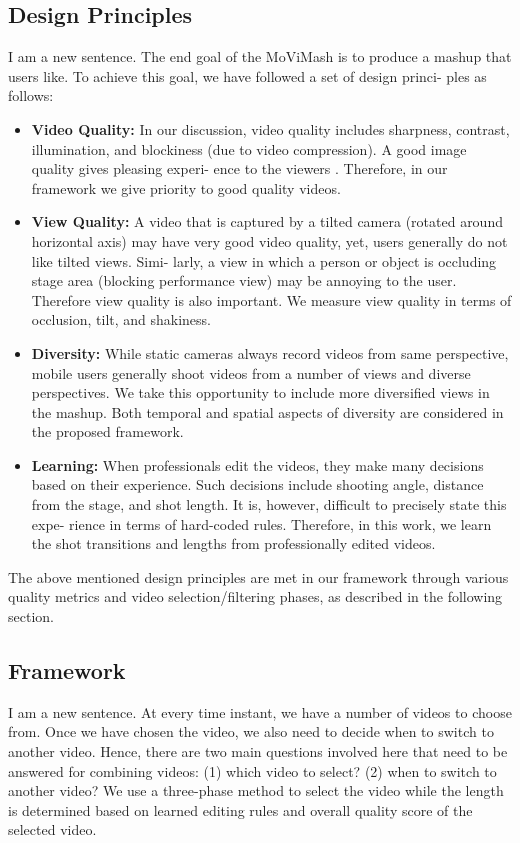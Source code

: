 \documentclass{sig-alternate}
\begin{document}
\subsection{Design Principles}
I am a new sentence.
The end goal of the MoViMash is to produce a mashup that users
like. To achieve this goal, we have followed a set of design princi-
ples as follows:
\begin{itemize}
\item \textbf{Video Quality:} In our discussion, video quality includes
sharpness, contrast, illumination, and blockiness (due to video
compression). A good image quality gives pleasing experi-
ence to the viewers \cite{salas:ten}. Therefore, in our framework we
give priority to good quality videos.
\item \textbf{View Quality:} A video that is captured by a tilted camera
(rotated around horizontal axis) may have very good video
quality, yet, users generally do not like tilted views. Simi-
larly, a view in which a person or object is occluding stage
area (blocking performance view) may be annoying to the
user. Therefore view quality is also important. We measure
view quality in terms of occlusion, tilt, and shakiness.
\item \textbf{Diversity:} While static cameras always record videos from
same perspective, mobile users generally shoot videos from
a number of views and diverse perspectives. We take this
opportunity to include more diversified views in the mashup.
Both temporal and spatial aspects of diversity are considered
in the proposed framework.
\item \textbf{Learning:} When professionals edit the videos, they make
many decisions based on their experience. Such decisions
include shooting angle, distance from the stage, and shot
length. It is, however, difficult to precisely state this expe-
rience in terms of hard-coded rules. Therefore, in this work,
we learn the shot transitions and lengths from professionally
edited videos.
\end{itemize}

The above mentioned design principles are met in our framework
through various quality metrics and video selection/filtering phases,
as described in the following section.

\subsection{Framework}
I am a new sentence.
At every time instant, we have a number of videos to choose
from. Once we have chosen the video, we also need to decide when
to switch to another video. Hence, there are two main questions
involved here that need to be answered for combining videos: (1)
which video to select? (2) when to switch to another video? We
use a three-phase method to select the video while the length is
determined based on learned editing rules and overall quality score
of the selected video.
\end{document}
